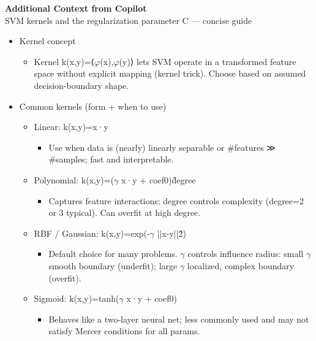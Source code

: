 \begin{framed}
\textbf{Additional Context from Copilot}\\
SVM kernels and the regularization parameter C --- concise guide

\begin{itemize}
\item Kernel concept

\begin{itemize}
\item Kernel k(x,y)=⟨$\varphi$(x),$\varphi$(y)⟩ lets SVM operate in a transformed feature space without explicit mapping (kernel trick). Choose based on assumed decision-boundary shape.
\end{itemize}


\item Common kernels (form + when to use)

\begin{itemize}
\item Linear: k(x,y)=x·y

\begin{itemize}
\item Use when data is (nearly) linearly separable or \#features ≫ \#samples; fast and interpretable.
\end{itemize}


\item Polynomial: k(x,y)=($\gamma$ x·y + coef0)\^degree

\begin{itemize}
\item Captures feature interactions; degree controls complexity (degree=2 or 3 typical). Can overfit at high degree.
\end{itemize}


\item RBF / Gaussian: k(x,y)=exp(-$\gamma$ ||x-y||\^2)

\begin{itemize}
\item Default choice for many problems. $\gamma$ controls influence radius: small $\gamma$ \rightarrow smooth boundary (underfit); large $\gamma$ \rightarrow localized, complex boundary (overfit).
\end{itemize}


\item Sigmoid: k(x,y)=tanh($\gamma$ x·y + coef0)

\begin{itemize}
\item Behaves like a two‑layer neural net; less commonly used and may not satisfy Mercer conditions for all params.
\end{itemize}



\end{itemize}
\end{itemize}
\end{framed}
